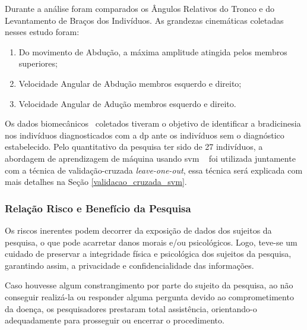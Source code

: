 Durante a análise foram comparados os Ângulos Relativos do Tronco e do Levantamento de Braços dos Indivíduos. As grandezas cinemáticas coletadas nesses estudo foram:
\begin{enumerate}
	\item Do movimento de Abdução, a máxima amplitude atingida pelos membros superiores;
	\item Velocidade Angular de Abdução membros esquerdo e direito;
	\item Velocidade Angular de Adução membros esquerdo e direito.
\end{enumerate}

Os dados biomecânicos~\cite{hamill1999bases} coletados tiveram o objetivo de identificar a bradicinesia nos indivíduos diagnosticados com a \ac{dp} ante os indivíduos sem o diagnóstico estabelecido. Pelo quantitativo da pesquisa ter sido de 27 indivíduos, a abordagem de aprendizagem de máquina usando \ac{svm} ~\cite{vapnik95} foi utilizada juntamente com a técnica de validação-cruzada \textit{leave-one-out}, essa técnica será explicada com mais detalhes na Seção \ref{validacao_cruzada_svm}.


\subsubsection{Relação Risco e Benefício da Pesquisa}
Os riscos inerentes podem decorrer da exposição de dados dos sujeitos da pesquisa, o que pode acarretar danos morais e/ou psicológicos. Logo, teve-se um cuidado de preservar a integridade física e psicológica dos sujeitos da pesquisa, garantindo assim, a privacidade e confidencialidade das informações.

Caso houvesse algum constrangimento por parte do sujeito da pesquisa, ao não conseguir realizá-la ou responder alguma pergunta devido ao comprometimento da doença, os pesquisadores prestaram total assistência, orientando-o adequadamente para prosseguir ou encerrar o procedimento.





